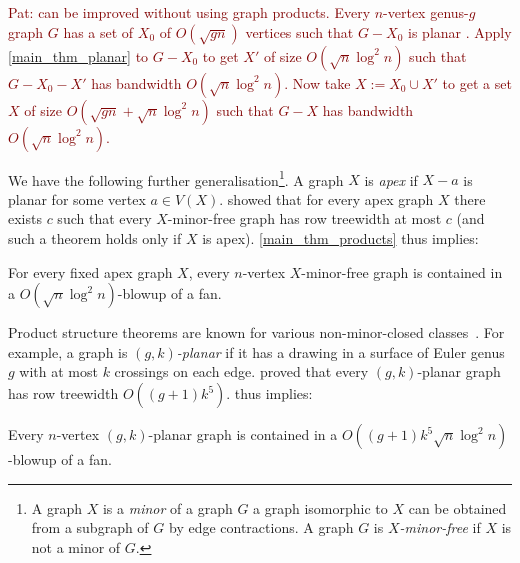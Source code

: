 \documentclass{patmorin}
\newcommand{\pat}[1]{\textcolor{Maroon}{Pat: #1}}
\newcommand{\defin}[1]{\emph{\textcolor{brightmaroon}{#1}}}
\begin{document}
\pat{ can be improved without using graph products. Every $n$-vertex genus-$g$ graph $G$ has a set of $X_0$ of $O(\sqrt{gn})$ vertices such that $G-X_0$ is planar \cite{eppstein:dynamic}. Apply \cref{main_thm_planar} to $G-X_0$ to get $X'$ of size $O(\sqrt{n}\log^2 n)$ such that $G-X_0-X'$ has bandwidth $O(\sqrt{n}\log^2 n)$.  Now take $X:=X_0\cup X'$ to get a set $X$ of size $O(\sqrt{gn} + \sqrt{n}\log^2 n)$ such that $G-X$ has bandwidth $O(\sqrt{n}\log^2 n)$.}

We have the following further generalisation\footnote{A graph $X$ is a \defin{minor} of a graph $G$ a graph isomorphic to $X$ can be obtained from a subgraph of $G$ by edge contractions. A graph $G$ is \defin{$X$-minor-free} if $X$ is not a minor of $G$.}.
A graph $X$ is \defin{apex} if $X-a$ is planar for some vertex $a\in V(X)$. \citet{dujmovic.joret.ea:planar} showed that for every apex graph $X$ there exists $c$ such that every $X$-minor-free graph has row treewidth at most $c$ (and such a theorem holds only if $X$ is apex). \cref{main_thm_products} thus implies:

\begin{thm}\label{apex_products}
For every fixed apex graph $X$, every $n$-vertex $X$-minor-free graph is contained in a $O(\sqrt{n}\log^2 n)$-blowup of a fan.
\end{thm}

Product structure theorems are known for various non-minor-closed classes~\citep{dujmovic.morin.ea:graph,HW24,distel.hickingbotham.ea:powers}. For example, a graph is \defin{$(g,k)$-planar} if it has a drawing in a surface of Euler genus $g$ with at most $k$ crossings on each edge. \citet{dujmovic.morin.ea:graph} proved that every $(g,k)$-planar graph has row treewidth  $O((g+1)k^5)$.  thus implies:

\begin{thm}\label{gkplanar_products}
Every $n$-vertex $(g,k)$-planar graph is contained in a $O((g+1)k^5\sqrt{n}\log^2 n)$-blowup of a fan.
\end{thm}
\end{document}
